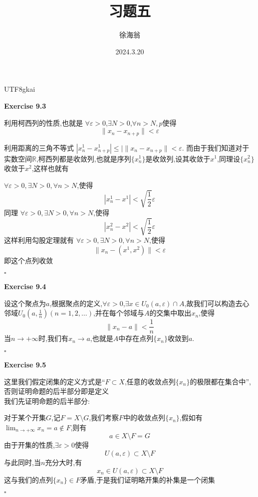 \documentclass{article}
\title{习题五}
\author{徐海翁}
\date{2024.3.20}
\newenvironment{exercise}[1]{%
{\textbf{Exercise #1} \\ 
    }
}{
  \hfill $\square$ 
  \par\bigskip 
}
\newcommand{\RR}{\mathbb{R}}
\begin{document}
\begin{CJK}{UTF8}{gkai}

\maketitle
\tableofcontents

\begin{exercise}{9.3}
    利用柯西列的性质,也就是
    $\forall \varepsilon > 0$,$\exists N > 0$,$\forall n > N,p$使得
    \[\|x_n - x_{n + p}\| < \varepsilon\]

    利用距离的三角不等式
    $|x_n^1 - x_{n + p}^1| \leq |\|x_n - x_{n + p}\| < \varepsilon$.
    而由于我们知道对于实数空间$\RR$,柯西列都是收敛列,也就是序列$\{x_n^1\}$是收敛列,设其收敛于$x^1$,同理设$\{x_n^2\}$收敛于$x^2$,这样也就有

    $\forall \varepsilon > 0, \exists N > 0,\forall n > N$,使得
    \[|x_n^1 - x^1| < \sqrt{\frac{1}{2}} \varepsilon\]
    同理
    $\forall \varepsilon > 0, \exists N > 0,\forall n > N$,使得
    \[|x_n^2 - x^2| < \sqrt{\frac{1}{2}} \varepsilon\]
    这样利用勾股定理就有
    $\forall \varepsilon > 0, \exists N > 0,\forall n > N$,使得
    \[\|x_n - (x^1,x^2)\| < \varepsilon\]
    即这个点列收敛
\end{exercise}

\begin{exercise}{9.4}
    设这个聚点为$a$,根据聚点的定义,$\forall \varepsilon > 0$,$\exists x \in U_0(a,\varepsilon)\cap A$,故我们可以构造去心邻域$U_0(a,\frac{1}{n})(n = 1,2,\ldots)$,并在每个邻域与$A$的交集中取出$x_n$,使得
    \[\|x_n - a\| < \frac{1}{n}\]
    当$n \to +\infty$时,我们有$x_n \to a$,也就是$A$中存在点列$\{x_n\}$收敛到$a$.
\end{exercise}

\begin{exercise}{9.5}
    这里我们假定闭集的定义方式是``$F \subset X$,任意的收敛点列$\{x_n\}$的极限都在集合中'',否则证明命题的后半部分即是定义\\

    我们先证明命题的后半部分:

    对于某个开集$G$,记$F = X \setminus G$,我们考察$F$中的收敛点列$\{x_n\}$,假如有~$\lim_{n \to +\infty} x_n = a \notin F$,则有
    \[a \in X \setminus F = G\]
    由于开集的性质,$\exists \varepsilon >0$使得
    \[U(a,\varepsilon) \subset X \setminus F\]
    与此同时,当$n$充分大时,有
    \[x_n \in U(a,\varepsilon) \subset X \setminus F\]
    这与我们的点列$\{x_n\} \in F$矛盾,于是我们证明略开集的补集是一个闭集


\end{exercise}
\end{CJK}
\end{document}
